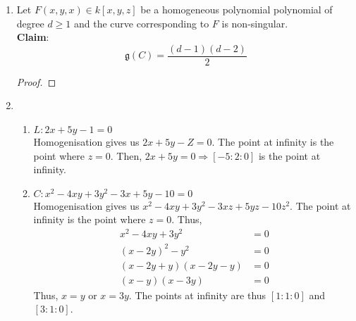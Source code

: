 \documentclass[oneside, 12pt, ]{article}
\newcommand{\QQ}{\mathbb Q}
\newcommand{\PP}{\mathbb P}
\begin{document}
\begin{enumerate}
\begin{enumerate}
\begin{proof}
$(\Leftarrow)$\\

Suppose $p\equiv 1 \pmod{4}$. Then there exists integers $a,b$ such that $p = a^2 + b^2$. Consider the map 
\begin{align*}
\phi : V_{p}(\QQ) &\longrightarrow \PP^1(\QQ) \\
[X,Y,Z] &\mapsto [aX + bY + pZ , (aY-bX)]
\end{align*}
This map is regular except maybe at the point $aY-bX=0, aX + bY + Z=0$, i.e., the point $[a:b:-1]$. \\

Note that 
\end{proof}

\item \textbf{Claim}: For $p \equiv 3 \pmod{4}$, no two $V_{p}$s are isomorphic.
\begin{proof}

\end{proof}
\end{enumerate}

\item Let $F(x,y,x) \in k[x,y,z]$ be a homogeneous polynomial polynomial of degree $d\geq 1$ and the curve corresponding to $F$ is non-singular. \\

\textbf{Claim}: 
\begin{equation*}
\mathfrak{g}(C) = \frac{(d-1)(d-2)}{2}
\end{equation*} 

\begin{proof}

\end{proof}

\item 
\begin{enumerate}
\item $L : 2x+5y-1=0$\\

Homogenisation gives us $2x + 5y - Z=0$. The point at infinity is the point where $z=0$. Then, $2x + 5y=0 \Rightarrow [-5:2:0]$ is the point at infinity.

\item $C : x^2 -4xy + 3y^2 -3x + 5y - 10=0$ \\

Homogenisation gives us $x^2 - 4xy + 3y^2 - 3xz + 5yz - 10z^2$. The point at infinity is the point where $z=0$. Thus, 
\begin{align*}
x^2 - 4xy + 3y^2 &=0\\
(x-2y)^2 -y^2 &=0\\
(x-2y + y)(x-2y-y) &= 0\\
(x-y)(x-3y) &=0
\end{align*}
Thus, $x=y$ or $x=3y$. The points at infinity are thus $[1:1:0]$ and $[3:1:0]$.
\end{enumerate}


\end{enumerate}
\end{document}
